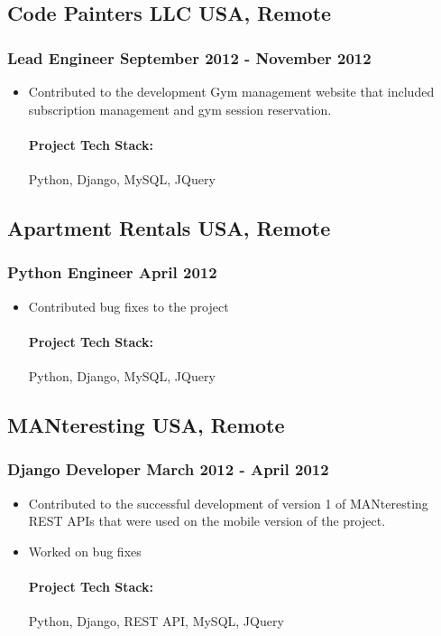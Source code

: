 \documentclass[11pt]{article} %
\begin{document}
\subsection{Code Painters LLC \hfill USA, Remote}
\subsubsection{Lead Engineer \hfill  September 2012 - November 2012}
\begin{itemize}
    \item Contributed to the development Gym management website that included subscription management and gym session reservation.
    \paragraph{Project Tech Stack:} Python, Django, MySQL, JQuery
\end{itemize}

\subsection{Apartment Rentals \hfill USA, Remote}
\subsubsection{Python Engineer \hfill  April 2012}
\begin{itemize}
    \item Contributed bug fixes to the project
    \paragraph{Project Tech Stack:} Python, Django, MySQL, JQuery
\end{itemize}

\subsection{MANteresting \hfill USA, Remote}
\subsubsection{Django Developer \hfill  March 2012 - April 2012}
\begin{itemize}
    \item Contributed to the successful development of version 1 of MANteresting REST APIs that were used on the mobile version of the project.
    \item Worked on bug fixes
    \paragraph{Project Tech Stack:} Python, Django, REST API, MySQL, JQuery
\end{itemize}
\end{document}
